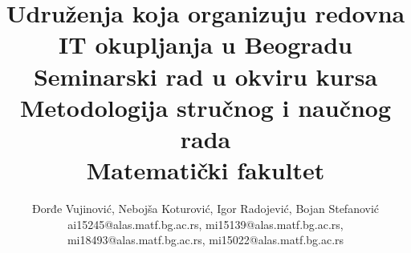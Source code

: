 \documentclass[a4paper]{article}
\begin{document}

\title{Udruženja koja organizuju redovna IT okupljanja u Beogradu\\ \small{Seminarski rad u okviru kursa\\Metodologija stručnog i naučnog rada\\ Matematički fakultet}}

\author{Đorđe Vujinović, Nebojša Koturović, Igor Radojević, Bojan Stefanović\\ ai15245@alas.matf.bg.ac.rs, mi15139@alas.matf.bg.ac.rs, \\ mi18493@alas.matf.bg.ac.rs, mi15022@alas.matf.bg.ac.rs}


\maketitle
\end{document}
